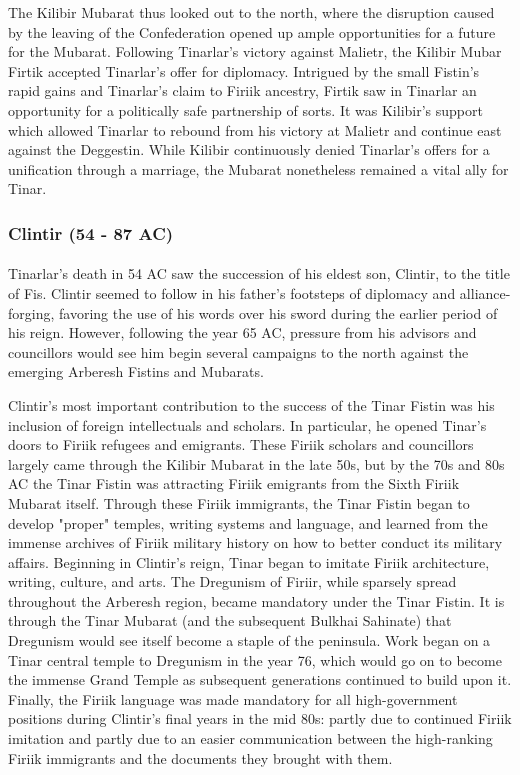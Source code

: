 						The Kilibir Mubarat thus looked out to the north, where the disruption caused by the leaving of the Confederation opened up ample opportunities for a future for the Mubarat. Following Tinarlar's victory against Malietr, the Kilibir Mubar Firtik accepted Tinarlar's offer for diplomacy. Intrigued by the small Fistin's rapid gains and Tinarlar's claim to Firiik ancestry, Firtik saw in Tinarlar an opportunity for a politically safe partnership of sorts. It was Kilibir's support which allowed Tinarlar to rebound from his victory at Malietr and continue east against the Deggestin. While Kilibir continuously denied Tinarlar's offers for a unification through a marriage, the Mubarat nonetheless remained a vital ally for Tinar.
			\subsubsection{Clintir (54 - 87 AC)}
				\paragraph{}
					Tinarlar's death in 54 AC saw the succession of his eldest son, Clintir, to the title of Fis. Clintir seemed to follow in his father's footsteps of diplomacy and alliance-forging, favoring the use of his words over his sword during the earlier period of his reign. However, following the year 65 AC, pressure from his advisors and councillors would see him begin several campaigns to the north against the emerging Arberesh Fistins and Mubarats.
				
					Clintir's most important contribution to the success of the Tinar Fistin was his inclusion of foreign intellectuals and scholars. In particular, he opened Tinar's doors to Firiik refugees and emigrants. These Firiik scholars and councillors largely came through the Kilibir Mubarat in the late 50s, but by the 70s and 80s AC the Tinar Fistin was attracting Firiik emigrants from the Sixth Firiik Mubarat itself. Through these Firiik immigrants, the Tinar Fistin began to develop "proper" temples, writing systems and language, and learned from the immense archives of Firiik military history on how to better conduct its military affairs. Beginning in Clintir's reign, Tinar began to imitate Firiik architecture, writing, culture, and arts. The Dregunism of Firiir, while sparsely spread throughout the Arberesh region, became mandatory under the Tinar Fistin. It is through the Tinar Mubarat (and the subsequent Bulkhai Sahinate) that Dregunism would see itself become a staple of the peninsula. Work began on a Tinar central temple to Dregunism in the year 76, which would go on to become the immense Grand Temple as subsequent generations continued to build upon it. Finally, the Firiik language was made mandatory for all high-government positions during Clintir's final years in the mid 80s: partly due to continued Firiik imitation and partly due to an easier communication between the high-ranking Firiik immigrants and the documents they brought with them.

